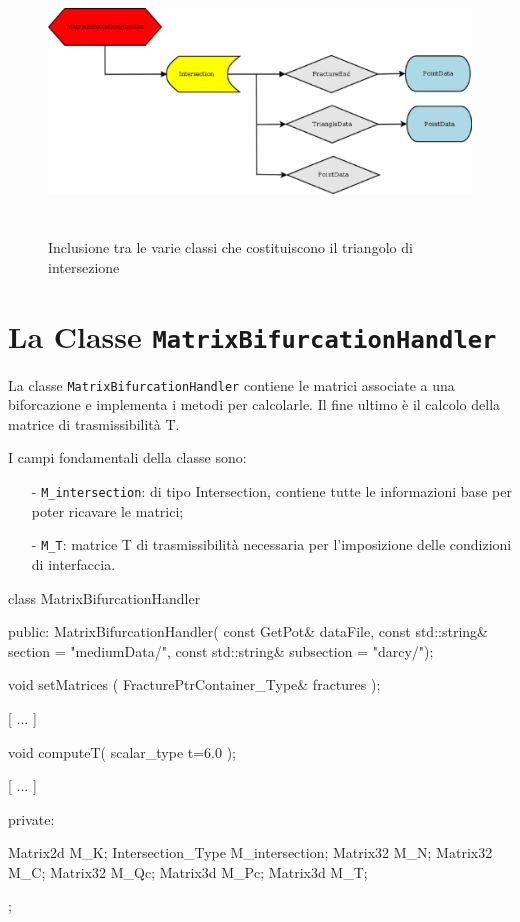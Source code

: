 \newpage
\begin{figure}[htbp]
\centering
\includegraphics[height=7cm, width=1\textwidth]{img/subcap3_3/MatrixBifurcationHandler2.eps}
\caption{Inclusione tra le varie classi che costituiscono il triangolo di intersezione}\label{Inclusione classi MatrixBifurcationHandler}
\end{figure}

\section{La Classe \texttt{MatrixBifurcationHandler}}
La classe \texttt{MatrixBifurcationHandler} contiene le matrici associate a una biforcazione e implementa i metodi per calcolarle.  Il fine ultimo è il calcolo della matrice di trasmissibilità T.

\noindent I campi fondamentali della classe sono:
	\begin{enumerate}
	\item[-] \texttt{M\_intersection}: di tipo Intersection, contiene tutte le informazioni base per poter ricavare le matrici;
	\item[-] \texttt{M\_T}: matrice T di trasmissibilità necessaria per l'imposizione delle condizioni di interfaccia.
	\end{enumerate} 
\begin{Code03_03}[caption={Classe \texttt{Intersection}}]
class MatrixBifurcationHandler
{
 public:
	MatrixBifurcationHandler( const GetPot& dataFile,
				const std::string& section = "mediumData/",
				const std::string& subsection = "darcy/");
	
	void setMatrices ( FracturePtrContainer_Type& fractures );
	
	[ ... ]
	
	void computeT( scalar_type t=6.0 );

	[ ... ]

 private:

	Matrix2d M_K;
	Intersection_Type M_intersection;
	Matrix32 M_N;
	Matrix32 M_C;
	Matrix32 M_Qc;
	Matrix3d M_Pc;
	Matrix3d M_T;
};
\end{Code03_03}

